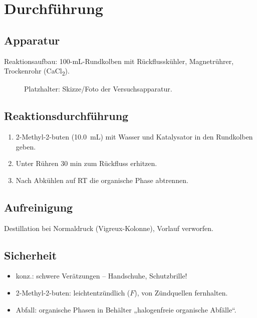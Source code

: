 \section{Durchführung}
\label{sec:durchfuehrung}

\subsection{Apparatur}
Reaktionsaufbau: 100-mL-Rundkolben mit Rückflusskühler, Magnetrührer,
Trockenrohr (CaCl\textsubscript{2}).

\begin{figure}[H]
  \centering
  \caption{Platzhalter: Skizze/Foto der Versuchsapparatur.}
  \label{fig:apparatur}
\end{figure}

\subsection{Reaktionsdurchführung}
\begin{enumerate}
  \item 2-Methyl-2-buten (\SI{10.0}{\milli\liter}) mit Wasser und
        Katalysator in den Rundkolben geben.
  \item Unter Rühren 30 min zum Rückfluss erhitzen.
  \item Nach Abkühlen auf RT die organische Phase abtrennen.
\end{enumerate}

\subsection{Aufreinigung}
Destillation bei Normaldruck (Vigreux-Kolonne), Vorlauf verworfen.

\subsection{Sicherheit}
\begin{itemize}
  \item {} konz.: schwere Verätzungen – Handschuhe, Schutzbrille!
  \item 2-Methyl-2-buten: leichtentzündlich ($F$), von Zündquellen fernhalten.
  \item Abfall: organische Phasen in Behälter „halogenfreie organische Abfälle“.
\end{itemize}
